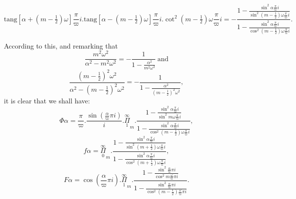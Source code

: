 \documentclass{article}
\begin{document}
\[
\text{tang}[\alpha+(m-\tfrac{1}{2})\omega]\frac{\pi}{\varpi}i.\text{tang}[\alpha-(m-\tfrac{1}{2})\omega]\frac{\pi}{\varpi}i.\cot^{2}(m-\tfrac{1}{2})\omega\frac{\pi}{\varpi}i = -\frac{1-\frac{\sin^{2}\alpha\frac{\pi}{\varpi}i}{\sin^{2}(m-\tfrac{1}{2})\omega\frac{\pi}{\varpi}i}}{1-\frac{\sin^{2}\alpha\frac{\pi}{\varpi}i}{\cos^{2}(m-\tfrac{1}{2})\omega\frac{\pi}{\varpi}i}}.
\]

According to this, and remarking that
\[
\frac{m^{2}\omega^{2}}{\alpha^{2}-m^{2}\omega^{2}} = -\frac{1}{1-\frac{\alpha^{2}}{m^{2}\omega^{2}}}\ \text{and}
\]
\[
\frac{(m-\tfrac{1}{2})^{2}\omega^{2}}{\alpha^{2}-(m-\tfrac{1}{2})^{2}\omega^{2}} = -\frac{1}{1-\frac{\alpha^{2}}{(m-\tfrac{1}{2})^{2}\omega^{2}}},
\]
it is clear that we shall have:
\[
\Phi\alpha = \frac{\pi}{\varpi}.\frac{\sin\left(\frac{\alpha}{\varpi}\pi i\right)}{i}.\overset{\infty}{\underset{1}{\Pi}}_{m}.\frac{1-\frac{\sin^{2}\alpha\frac{\pi}{\varpi}i}{\sin^{2}m\omega\frac{\pi}{\varpi}i}}{1-\frac{\sin^{2}\alpha\frac{\pi}{\varpi}i}{\cos^{2}(m-\tfrac{1}{2})\omega\frac{\pi}{\varpi}i}},
\tag{181.}
\]
\[
f\alpha = \overset{\infty}{\underset{0}{\Pi}}_{m}.\frac{1-\frac{\sin^{2}\alpha\frac{\pi}{\varpi}i}{\sin^{2}(m+\tfrac{1}{2})\omega\frac{\pi}{\varpi}i}}{1-\frac{\sin^{2}\alpha\frac{\pi}{\varpi}i}{\cos^{2}(m+\tfrac{1}{2})\omega\frac{\pi}{\varpi}i}},
\tag{182.}
\]
\[
F\alpha = \cos\left(\frac{\alpha}{\varpi}\pi i\right).\overset{\infty}{\underset{1}{\Pi}}_{m}.\frac{1-\frac{\sin^{2}\frac{\alpha}{\varpi}\pi i}{\cos^{2}m\frac{\omega}{\varpi}\pi i}}{1-\frac{\sin^{2}\frac{\alpha}{\varpi}\pi i}{\cos^{2}(m-\tfrac{1}{2})\frac{\omega}{\varpi}\pi i}}.
\tag{183.}
\]

\end{document}
